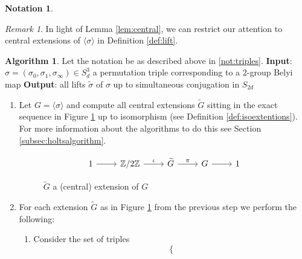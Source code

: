 \documentclass{dcthesis}
\newcommand{\ZZ}{\mathbb Z}
\newcommand{\wt}[1]{\widetilde{#1}}
\theoremstyle{definition}
\newtheorem{alg}[prop]{Algorithm}
\newtheorem{notation}[prop]{Notation}
\theoremstyle{remark}
\newtheorem{remark}[prop]{Remark}
\numberwithin{equation}{section}
\numberwithin{figure}{section}
\begin{document}
{{\begin{notation}
\begin{remark}
        \label{rmk:central}
        In light of Lemma \ref{lem:central},
        we can restrict our attention to central extensions of
        $\langle\sigma\rangle$
        in Definition \ref{def:lift}.
      \end{remark}
    \end{notation}
    \begin{alg}\label{alg:triples}
      Let the notation be as described above in \ref{not:triples}.
      \newline
      \textbf{Input}: $\sigma=(\sigma_0,\sigma_1,\sigma_\infty)\in S_d^3$ a permutation triple
      corresponding to a $2$-group Belyi map
      \newline
      \textbf{Output}: all lifts $\wt{\sigma}$
      of $\sigma$ up to simultaneous conjugation in $S_{2d}$
      \begin{enumerate}
        \item
          Let $G = \langle\sigma\rangle$
          and compute all central extensions $\wt{G}$
          sitting in the exact sequence in Figure \ref{fig:centralext}
          up to isomorphism (see Definition \ref{def:isoextentions}).
          For more information about the algorithms to do this
          see Section \ref{subsec:holtsalgorithm}.
          \begin{figure}[ht]
            \[
              \begin{tikzcd}[ampersand replacement=\&, row sep = small]
                1\arrow{r}\&\ZZ/2\ZZ\arrow{r}{\iota}\&\wt{G}\arrow{r}{\pi}\&G\arrow{r}\&1
              \end{tikzcd}
            \]
            \caption{$\wt{G}$ a (central) extension of $G$}
            \label{fig:centralext}
          \end{figure}
        \item
          For each extension $\wt{G}$ as in Figure \ref{fig:centralext}
          from the previous step
          we perform the following:
          \begin{enumerate}
            \item
              Consider the set of triples
              \begin{equation}
                \label{eqn:lifts}
                \{

\end{equation}
\end{enumerate}
\end{enumerate}
\end{alg}}}
\end{document}
